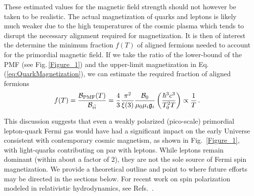 \documentclass[epjST]{svjour}
\newcommand{\req}[1]{Eq.\,(\ref{#1})}
\newcommand{\rf}[1]{Fig.\,{\ref{#1}}}
\begin{document}
{\color{blue}These estimated values for the magnetic field strength should not however be taken to be realistic. The actual magnetization of quarks and leptons is likely much weaker due to the high temperatures of the cosmic plasma which tends to disrupt the necessary alignment required for magnetization. It is then of interest the determine the minimum fraction \(f(T)\) of aligned fermions needed to account for the primordial magnetic field. If we take the ratio of the lower-bound of the PMF (see \rf{Figure_1}) and the upper-limit magnetization in \req{eq:QuarkMagnetization}, we can estimate the required fraction of aligned fermions
\begin{equation}
\label{eq:FractionAligned}
f(T) = \frac{\mathcal{B}_{\rm PMF}(T)}{\mathcal{B}_{i\bar{i}}} 
= \frac{4}{3}\frac{\pi^{2}}{\xi(3)}\frac{\mathcal{B}_{0}}{\mu_{0}\mu_{i}\mathfrak{g}_{i}}\left(\frac{\hbar^{3}c^{3}}{T_{0}^{2}T}\right)\propto\frac{1}{T}\,.
\end{equation}


}



This discussion suggests that even a weakly polarized (pico-scale) primordial lepton-quark Fermi gas would have had a significant impact on the early Universe consistent with contemporary cosmic magnetism, as shown in Fig.~\ref{Figure_1}, with light-quarks contributing on par with leptons. While leptons remain dominant (within about a factor of 2), they are not the sole source of Fermi spin magnetization. We provide a theoretical outline and point to where future efforts may be directed in the sections below. For recent work on spin polarization modeled in relativistic hydrodynamics, see Refs.~\cite{Florkowski:2024cif,Bhadury:2024whs,Becattini:2024uha,Singh:2024cub}.
\end{document}
